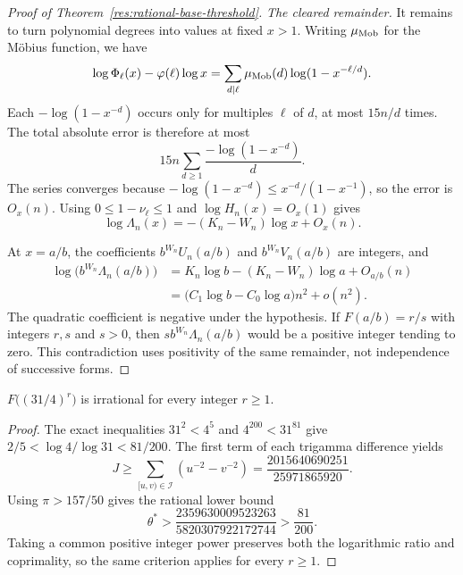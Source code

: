 \documentclass[11pt]{article}
\begin{document}
\begin{proof}[Proof of Theorem~\ref{res:rational-base-threshold}]
\emph{The cleared remainder.}
It remains to turn polynomial degrees into values at fixed $x>1$.
Writing $\mu_{\rm Mob}$ for the M\"obius function, we have
\[
 \log\Phi_\ell(x)-\varphi(\ell)\log x
 =\sum_{d\mid\ell}\mu_{\rm Mob}(d)\log(1-x^{-\ell/d}).
\]
Each $-\log(1-x^{-d})$ occurs only for multiples $\ell$ of $d$,
at most $15n/d$ times. The total absolute error is therefore at most
\[
 15n\sum_{d\ge1}\frac{-\log(1-x^{-d})}{d}.
\]
The series converges because
$-\log(1-x^{-d})\le x^{-d}/(1-x^{-1})$, so the error is $O_x(n)$.
Using $0\le1-\nu_\ell\le1$ and $\log H_n(x)=O_x(1)$ gives
\[
 \log\Lambda_n(x)=-(K_n-W_n)\log x+O_x(n).
\]

At $x=a/b$, the coefficients $b^{W_n}U_n(a/b)$ and
$b^{W_n}V_n(a/b)$ are integers, and
\[
\begin{split}
 \log\bigl(b^{W_n}\Lambda_n(a/b)\bigr)
 &=K_n\log b-(K_n-W_n)\log a+O_{a/b}(n)\\
 &=\bigl(C_1\log b-C_0\log a\bigr)n^2+o(n^2).
\end{split}
\]
The quadratic coefficient is negative under the hypothesis.
If $F(a/b)=r/s$ with integers $r,s$ and $s>0$, then
$s b^{W_n}\Lambda_n(a/b)$ would be a positive integer tending
to zero. This contradiction uses positivity of the same remainder,
not independence of successive forms.
\end{proof}

\begin{corollary}\label{res:thirtyone-four}
$F\bigl((31/4)^r\bigr)$ is irrational for every integer $r\ge1$.
\end{corollary}
\begin{proof}
The exact inequalities $31^2<4^5$ and $4^{200}<31^{81}$ give
$2/5<\log4/\log31<81/200$.
The first term of each trigamma difference yields
\[
 J\ge\sum_{[u,v)\in\mathcal I}(u^{-2}-v^{-2})
   =\frac{2015640690251}{25971865920}.
\]
Using $\pi>157/50$ gives the rational lower bound
\[
 \theta^*>\frac{2359630009523263}{5820307922172744}
           >\frac{81}{200}.
\]
Taking a common positive integer power preserves both the logarithmic
ratio and coprimality, so the same criterion applies for every $r\ge1$.
\end{proof}
\end{document}
